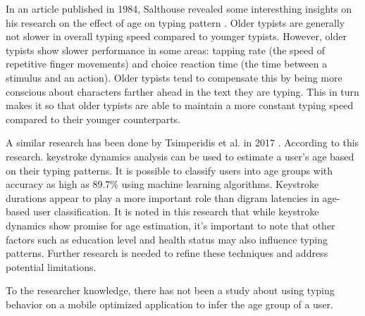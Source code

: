 In an article published in 1984, Salthouse revealed some interesthing insights on his research on the effect of age on typing pattern \cite{Salthouse1984}.
Older typists are generally not slower in overall typing speed compared to younger typists.
However, older typists show slower performance in some areas: tapping rate (the speed of repetitive finger movements) and choice reaction time (the time between a stimulus and an action).
Older typists tend to compensate this by being more conscious about characters farther ahead in the text they are typing.
This in turn makes it so that older typists are able to maintain a more constant typing speed compared to their younger counterparts.

A similar research has been done by Tsimperidis et al. in 2017 \cite{Tsimperidis2017}.
According to this research. keystroke dynamics analysis can be used to estimate a user's age based on their typing patterns. 
It is possible to classify users into age groups with accuracy as high as 89.7\% using machine learning algorithms.
Keystroke durations appear to play a more important role than digram latencies in age-based user classification.
It is noted in this research that while keystroke dynamics show promise for age estimation, it's important to note that other factors such as education level and health status may also influence typing patterns.
Further research is needed to refine these techniques and address potential limitations.

To the researcher knowledge, there has not been a study about using typing behavior on a mobile optimized application to infer the age group of a user.